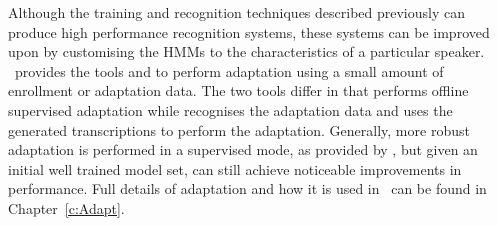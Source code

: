 Although the training and recognition techniques described previously can
produce high performance recognition systems, these systems 
can be improved upon by customising the HMMs to the characteristics of a 
particular speaker. \HTK\ provides the tools 
 and 
 to perform adaptation 
using a small amount of enrollment or 
adaptation data. The two tools differ in that  performs
offline supervised adaptation while  recognises the
adaptation data and uses the generated transcriptions to 
perform the adaptation. 
Generally, more robust adaptation is performed in a supervised mode,
as provided by , but 
given an initial well trained model set,  can still achieve 
noticeable improvements in performance. 
Full details of adaptation and how it is used in \HTK\ can be found in 
Chapter~\ref{c:Adapt}.



